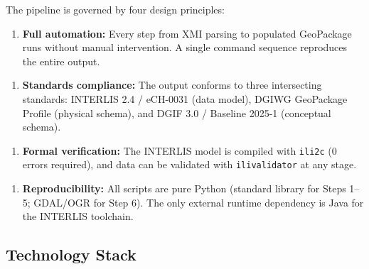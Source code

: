 \documentclass[conference]{IEEEtran}
\begin{document}
The pipeline is governed by four design principles:

\begin{enumerate}[leftmargin=*]
\item \textbf{Full automation:} Every step from XMI parsing to populated GeoPackage runs without manual intervention. A single command sequence reproduces the entire output.
\end{enumerate}

\begin{enumerate}[leftmargin=*]
\item \textbf{Standards compliance:} The output conforms to three intersecting standards: INTERLIS 2.4 / eCH-0031 (data model), DGIWG GeoPackage Profile (physical schema), and DGIF 3.0 / Baseline 2025-1 (conceptual schema).
\end{enumerate}

\begin{enumerate}[leftmargin=*]
\item \textbf{Formal verification:} The INTERLIS model is compiled with \texttt{ili2c} (0 errors required), and data can be validated with \texttt{ilivalidator} at any stage.
\end{enumerate}

\begin{enumerate}[leftmargin=*]
\item \textbf{Reproducibility:} All scripts are pure Python (standard library for Steps 1–5; GDAL/OGR for Step 6). The only external runtime dependency is Java for the INTERLIS toolchain.
\end{enumerate}

\subsection{Technology Stack}
\end{document}
